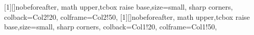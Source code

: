 \newtcbox{\mathboxg}[1][]{nobeforeafter, math upper,tcbox raise base,size=small, 
  sharp corners, colback=Col2!20, colframe=Col2!50,
}
\newtcbox{\mathboxr}[1][]{nobeforeafter, math upper,tcbox raise base,size=small,
  sharp corners, colback=Col1!20, colframe=Col1!50,
}
